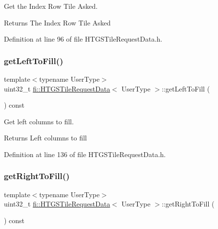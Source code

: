 Get the Index Row Tile Asked. 

\begin{DoxyReturn}{Returns}
The Index Row Tile Asked 
\end{DoxyReturn}


Definition at line 96 of file H\+T\+G\+S\+Tile\+Request\+Data.\+h.

\mbox{\label{classfi_1_1HTGSTileRequestData_ae708e4fbcd565fec5ac38f866b4754b7}} 
\subsubsection{\texorpdfstring{get\+Left\+To\+Fill()}{getLeftToFill()}}
{\footnotesize\ttfamily template$<$typename User\+Type$>$ \\
uint32\+\_\+t \hyperlink{classfi_1_1HTGSTileRequestData}{fi\+::\+H\+T\+G\+S\+Tile\+Request\+Data}$<$ User\+Type $>$\+::get\+Left\+To\+Fill (\begin{DoxyParamCaption}{ }\end{DoxyParamCaption}) const\hspace{0.3cm}{\ttfamily [inline]}}



Get left columns to fill. 

\begin{DoxyReturn}{Returns}
Left columns to fill 
\end{DoxyReturn}


Definition at line 136 of file H\+T\+G\+S\+Tile\+Request\+Data.\+h.

\mbox{\label{classfi_1_1HTGSTileRequestData_a4fd101f0427e4712157d096e739dcd84}} 
\subsubsection{\texorpdfstring{get\+Right\+To\+Fill()}{getRightToFill()}}
{\footnotesize\ttfamily template$<$typename User\+Type$>$ \\
uint32\+\_\+t \hyperlink{classfi_1_1HTGSTileRequestData}{fi\+::\+H\+T\+G\+S\+Tile\+Request\+Data}$<$ User\+Type $>$\+::get\+Right\+To\+Fill (\begin{DoxyParamCaption}{ }\end{DoxyParamCaption}) const\hspace{0.3cm}{\ttfamily [inline]}}



